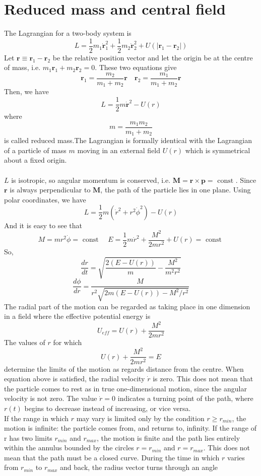 \section{Reduced mass and central field}
The Lagrangian for a two-body system is
\[L = \frac{1}{2} m_1 \dot{\bm{r}}_1^2 + \frac{1}{2} m_2 \dot{\bm{r}}_2^2 + U(|\bm{r}_1 - \bm{r}_2|)\]
Let $\bm{r} \equiv \bm{r}_1 -\bm{r}_2 $ be the relative position vector and let the origin be at the centre of mass, i.e. $m_1\bm{r}_1 + m_2\bm{r}_2 = 0$. These two equations give
\[\bm{r}_1 = \frac{m_2}{m_1+m_2}\bm{r} \quad \bm{r}_2 = \frac{m_1}{m_1+m_2}\bm{r}\]
Then, we have
\[L = \frac{1}{2} m \dot{\bm{r}}^2 - U(r)\]
where
\[m = \frac{m_1m_2}{m_1+m_2}\]
is called reduced mass.The Lagrangian is formally identical with the Lagrangian of a particle of mass $m$ moving in an external field $U(r)$ which is symmetrical about a fixed origin. \\ \\
$L$ is isotropic, so angular momentum is conserved, i.e. $\bm{M} = \bm{r} \times \bm{p} = \mbox{ const }$. Since $\bm{r}$ is always perpendicular to $\bm{M}$, the path of the particle lies in one plane. Using polar coordinates, we have
\[L = \frac{1}{2}m(\dot{r}^2 + r^2 \dot{\phi}^2)-U(r)\]
And it is easy to see that
\[M = mr^2\dot{\phi} = \mbox{ const } \quad E = \frac{1}{2}m \dot{r}^2 + \frac{M^2}{2mr^2} + U(r) = \mbox{ const }\]
So,
\[\frac{dr}{dt} = \sqrt{\frac{2(E-U(r))}{m} - \frac{M^2}{m^2r^2}}\]
\[\frac{d\phi}{dr} = \frac{M}{r^2 \sqrt{2m(E-U(r))-M^2/r^2}}\]
The radial part of the motion can be regarded as taking place in one dimension in a field where the effective potential energy is
\[U_{eff} = U(r) + \frac{M^2}{2mr^2}\]
The values of $r$ for which
\[U(r) + \frac{M^2}{2mr^2} = E\]
determine the limits of the motion as regards distance from the centre. When equation above is satisfied, the radial velocity $\dot{r}$ is zero. This does not mean that the particle comes to rest as in true one-dimensional motion, since the angular velocity is not zero. The value $\dot{r} = 0$ indicates a turning point of the path, where $r(t)$ begins to decrease instead of increasing, or vice versa.\\ 
If the range in which $r$ may vary is limited only by the condition $r \ge r_{min}$, the motion is infinite: the particle comes from, and returns to, infinity.
If the range of r has two limits $r_{min}$ and $r_{max}$, the motion is finite and the path lies entirely within the annulus bounded by the circles $r = r_{min}$ and $r = r_{max}$. This does not mean that the path must be a closed curve. During the time in which $r$ varies from $r_{min}$ to $r_{max}$ and back, the radius vector turns through an angle
